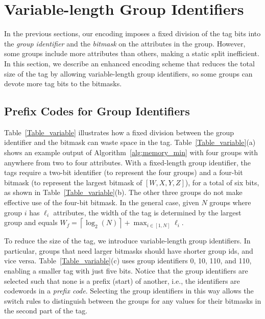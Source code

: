 \section{Variable-length Group Identifiers}
\label{sec:identifiers}
In the previous sections, our encoding imposes a fixed division of the
tag bits into the \emph{group identifier} and the \emph{bitmask} on
the attributes in the group.  However, some groups include more
attributes than others, making a static split inefficient. In this
section, we describe an enhanced encoding scheme that reduces the
total size of the tag by allowing variable-length group identifiers,
so some groups can devote more tag bits to the bitmasks.

\subsection{Prefix Codes for Group Identifiers}
Table~\ref{Table_variable} illustrates how a fixed division between
the group identifier and the bitmask can waste space in the tag.
Table~\ref{Table_variable}(a) shows an example output of
Algorithm~\ref{alg:memory_min} with four groups with anywhere from two
to four attributes.  With a fixed-length group identifier, the tags
require a two-bit identifier (to represent the four groups) and a
four-bit bitmask (to represent the largest bitmask of $[W,X,Y,Z]$),
for a total of six bits, as shown in Table~\ref{Table_variable}(b).
The other three groups do not make effective use of the four-bit
bitmask.  In the general case, given $N$ groups where group $i$ has
$\ell_i$ attributes, the width of the tag is determined by the largest
group and equals $W_{f} = \left \lceil \log_2(N) \right \rceil +
\max_{i \in [1,N]} \ell_i$.

To reduce the size of the tag, we introduce variable-length group
identifiers.  In particular, groups that need larger bitmasks should
have shorter group ids, and vice versa.  Table~\ref{Table_variable}(c)
uses group identifiers 0, 10, 110, and 110, enabling a smaller tag with
just five bits.  Notice that the group identifiers are selected such
that none is a prefix (start) of another, i.e., the identifiers are
codewords in a \emph{prefix code}.  Selecting the group identifiers in
this way allows the switch rules to distinguish between the groups
for any values for their bitmasks in the second part of the tag.

%
%

